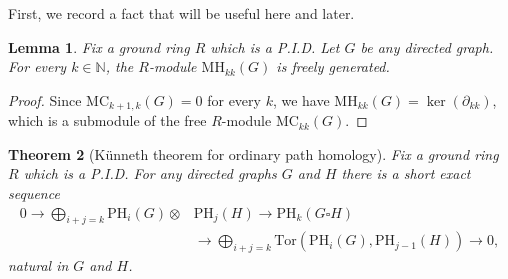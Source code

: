 \documentclass[a4paper, 11 pt, oneside, reqno]{amsart}
\newtheorem{lemma}{Lemma}
\numberwithin{lemma}{section}
\newtheorem{theorem}[lemma]{Theorem}
\theoremstyle{definition}
\newcommand{\MC}{\mathrm{MC}}
\newcommand{\MH}{\mathrm{MH}}
\newcommand{\OPH}{\mathrm{PH}}
\begin{document}
First, we record a fact that will be useful here and later.

\begin{lemma}
\label{lem:diag_free}
    Fix a ground ring \(R\) which is a P.I.D. Let \(G\) be any directed graph. For every \(k \in \mathbb{N}\), the \(R\)-module \(\MH_{kk}(G)\) is freely generated.
\end{lemma}

\begin{proof}
    Since \(\MC_{k+1,k}(G) = 0\) for every \(k\), we have \(\MH_{kk}(G) = \ker(\partial_{kk})\), which is a submodule of the free \(R\)-module \(\MC_{kk}(G)\).
\end{proof}

\begin{theorem}[K\"unneth theorem for ordinary path homology]\label{thm:kunneth_box_OPH}
Fix a ground ring \(R\) which is a P.I.D. For any directed graphs \(G\) and \(H\) there is a short exact sequence 
    \begin{equation}
    \label{eq:SES_OPH}
    \begin{split}
    0 \to \bigoplus_{i+j=k} \OPH_{i}(G) \otimes & \OPH_{j}(H) \to \OPH_{k}(G \square H) \\
    & \to \bigoplus_{i+j=k} \mathrm{Tor}(\OPH_{i}(G),\OPH_{j-1}(H)) \to 0,
    \end{split}
    \end{equation}
    natural in \(G\) and \(H\).
\end{theorem}
\end{document}

